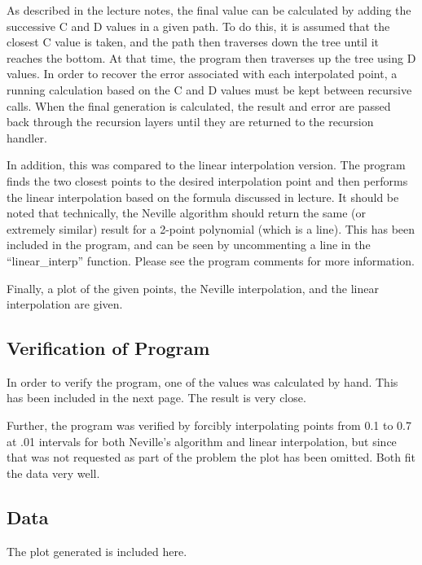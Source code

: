 \documentclass[10pt,letter]{article}
\begin{document}
As described in the lecture notes, the final value can be calculated by adding the successive C and D values in a given path. To do this, it is assumed that the closest C value is taken, and the path then traverses down the tree until it reaches the bottom. At that time, the program then traverses up the tree using D values. In order to recover the error associated with each interpolated point, a running calculation based on the C and D values must be kept between recursive calls. When the final generation is calculated, the result and error are passed back through the recursion layers until they are returned to the recursion handler.

In addition, this was compared to the linear interpolation version. The program finds the two closest points to the desired interpolation point and then performs the linear interpolation based on the formula discussed in lecture. It should be noted that technically, the Neville algorithm should return the same (or extremely similar) result for a 2-point polynomial (which is a line). This has been included in the program, and can be seen by uncommenting a line in the ``linear\_interp'' function. Please see the program comments for more information.

Finally, a plot of the given points, the Neville interpolation, and the linear interpolation are given.

\subsection{Verification of Program}

In order to verify the program, one of the values was calculated by hand. This has been included in the next page. The result is very close.

Further, the program was verified by forcibly interpolating points from 0.1 to 0.7 at .01 intervals for both Neville's algorithm and linear interpolation, but since that was not requested as part of the problem the plot has been omitted. Both fit the data very well.

\pagebreak

\subsection{Data}

The plot generated is included here.
\end{document}
